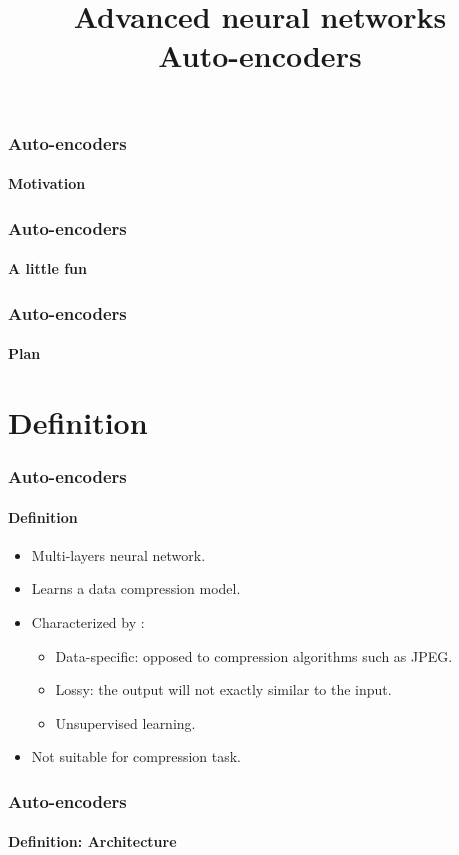 \documentclass[xcolor=table]{beamer}
\title[ANN: Auto-encoders] %
{Advanced neural networks\\Auto-encoders}
\begin{document}
\begin{frame}
\frametitle{Auto-encoders}
\framesubtitle{Motivation}


\end{frame}

\begin{frame}
	\frametitle{Auto-encoders}
	\framesubtitle{A little fun}
	
	
\end{frame}

\begin{frame}
\frametitle{Auto-encoders}
\framesubtitle{Plan}

\begin{multicols}{2}
	\tableofcontents
\end{multicols}
\end{frame}


\section{Definition}

\begin{frame}
\frametitle{Auto-encoders}
\framesubtitle{Definition}

\begin{itemize}
	\item Multi-layers neural network.
	\item Learns a data compression model.
	\item Characterized by \cite{2016-keras}:
	\begin{itemize}
		\item Data-specific: opposed to compression algorithms such as JPEG.
		\item Lossy: the output will not exactly similar to the input.
		\item Unsupervised learning. 
	\end{itemize}
	\item Not suitable for compression task.
\end{itemize}

\end{frame}

\begin{frame}
	\frametitle{Auto-encoders}
	\framesubtitle{Definition: Architecture}


\end{frame}
\end{document}

